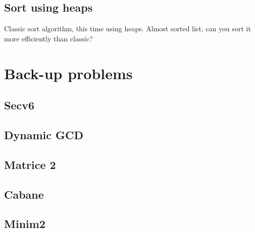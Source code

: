 \documentclass{llncs}
\begin{document}
\subsection{Sort using heaps}
Classic sort algorithm, this time using heaps. Almost sorted list, can you sort it more efficiently than classic?

%
%
%

\section{Back-up problems}

\subsection{Secv6 \cite{website:infoarena/secv6}}
\subsection{Dynamic GCD \cite{website:timus/gcd}}
\subsection{Matrice 2 \cite{website:infoarena/matrice2}}
\subsection{Cabane \cite{website:infoarena/cabane}}
\subsection{Minim2 \cite{website:infoarena/minim2}}


\clearpage


\end{document}
